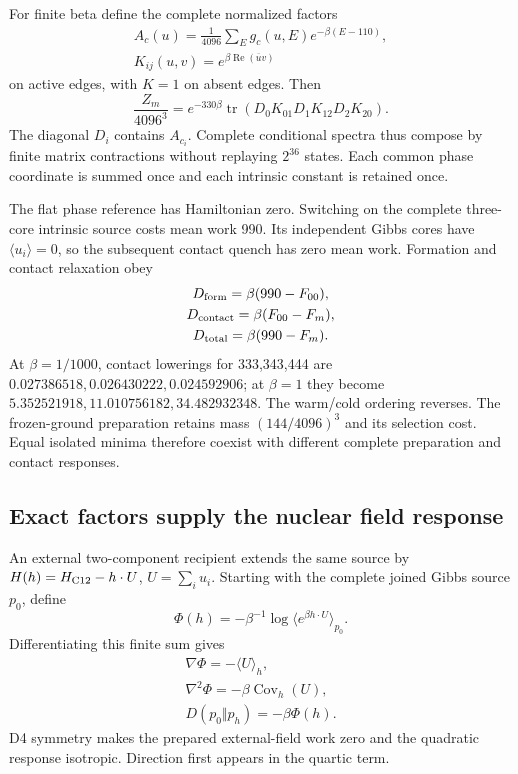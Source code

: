For finite beta define the complete normalized factors
\[
\begin{gathered}
A_c(u)=\frac1{4096}\sum_Eg_c(u,E)e^{-\beta(E-110)},\\
 K_{ij}(u,v)=e^{\beta\operatorname{Re}(\overline uv)}
\end{gathered}
\]
on active edges, with \(K=1\) on absent edges. Then
\[
 \frac{Z_m}{4096^3}
 =e^{-330\beta}\operatorname{tr}
       (D_0K_{01}D_1K_{12}D_2K_{20}).
\]
The diagonal \(D_i\) contains \(A_{c_i}\). Complete conditional spectra
thus compose by finite matrix contractions without replaying \(2^{36}\)
states. Each common phase coordinate is summed once and each intrinsic
constant is retained once.

The flat phase reference has Hamiltonian zero. Switching on the complete
three-core intrinsic source costs mean work 990. Its independent Gibbs
cores have \(\langle u_i\rangle=0\), so the subsequent contact quench has
zero mean work. Formation and contact relaxation obey
\[
\begin{gathered}
D_{\rm form}=\beta(990-F_{00}),\\
 D_{\rm contact}=\beta(F_{00}-F_m),\\
 D_{\rm total}=\beta(990-F_m).
\end{gathered}
\]
At \(\beta=1/1000\), contact lowerings for 333,343,444 are
\(0.027386518,0.026430222,0.024592906\); at \(\beta=1\) they become
\(5.352521918,11.010756182,34.482932348\). The warm/cold ordering reverses.
The frozen-ground preparation retains mass \((144/4096)^3\) and its
selection cost. Equal isolated minima therefore coexist with different
complete preparation and contact responses.

\subsection{Exact factors supply the nuclear field response}

An external two-component recipient extends the same source by
\(H(h)=H_{\rm C12}-h\cdot U\), \(U=\sum_i u_i\). Starting with the complete
joined Gibbs source \(p_0\), define
\[
 \Phi(h)=-\beta^{-1}\log\langle e^{\beta h\cdot U}\rangle_{p_0}.
\]
Differentiating this finite sum gives
\[
\begin{gathered}
\nabla\Phi=-\langle U\rangle_h,\\
 \nabla^2\Phi=-\beta\operatorname{Cov}_h(U),\\
 D(p_0\Vert p_h)=-\beta\Phi(h).
\end{gathered}
\]
D4 symmetry makes the prepared external-field work zero and the quadratic
response isotropic. Direction first appears in the quartic term.

